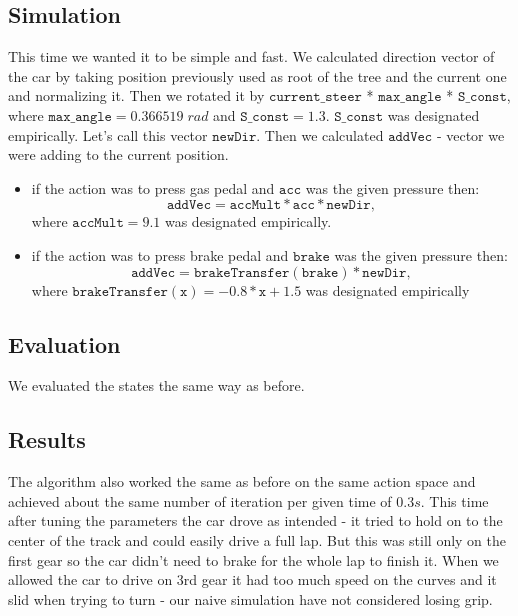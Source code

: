 \documentclass[11pt]{article}
\begin{document}
    \subsection*{Simulation}
    This time we wanted it to be simple and fast. We calculated direction vector of the car by taking position previously used as root of the tree and the current one and normalizing it. Then we rotated it by  $\texttt{current\_steer}$ * $\texttt{max\_angle}$ * $\texttt{S\_const}$, where $\texttt{max\_angle} = 0.366519\;rad$ and $\texttt{S\_const} = 1.3$.
    $\texttt{S\_const}$ was designated empirically. Let's call this vector $\texttt{newDir}$. Then we calculated $\texttt{addVec}$ - vector we were adding to the current position.
    \begin{itemize}
        \item if the action was to press gas pedal and $\texttt{acc}$ was the given pressure then:
        $$\texttt{addVec} = \texttt{accMult} * \texttt{acc} * \texttt{newDir},$$
        where $\texttt{accMult} = 9.1$ was designated empirically.
        \item if the action was to press brake pedal and $\texttt{brake}$ was the given pressure then:
        $$\texttt{addVec} = \texttt{brakeTransfer}(\texttt{brake}) * \texttt{newDir},$$
        where $\texttt{brakeTransfer}(\texttt{x}) = -0.8 * \texttt{x} + 1.5$ was designated empirically
    \end{itemize}
    
    \subsection*{Evaluation}
    We evaluated the states the same way as before.
    \subsection*{Results}
    The algorithm also worked the same as before on the same action space and achieved about the same number of iteration per given time of $0.3s$. This time after tuning the parameters the car drove as intended - it tried to hold on to the center of the track and could easily drive a full lap. But this was still only on the first gear so the car didn't need to brake for the whole lap to finish it. When we allowed the car to drive on 3rd gear it had too much speed on the curves and it slid when trying to turn - our naive simulation have not considered losing grip.
    
\end{document}

